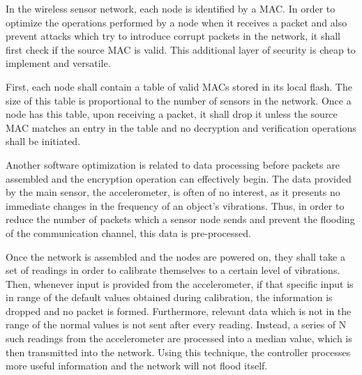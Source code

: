 In the wireless sensor network, each node is identified by a MAC. In order to optimize the 
operations performed by a node when it receives a packet and also prevent attacks which 
try to introduce corrupt packets in the network, it shall first check if the source MAC 
is valid. This additional layer of security is cheap to implement and versatile.

First, each node shall contain a table of valid MACs stored in its local flash. The size of this 
table is proportional to the number of sensors in the network. Once a node has this table, upon 
receiving a packet, it shall drop it unless the source MAC matches an entry in the table 
and no decryption and verification operations shall be initiated.

Another software optimization is related to data processing before packets are assembled and 
the encryption operation can effectively begin. The data provided by the main sensor, the 
accelerometer, is often of no interest, as it presents no immediate changes in the frequency of 
an object's vibrations. Thus, in order to reduce the number of packets which a sensor node sends 
and prevent the flooding of the communication channel, this data is pre-processed.

Once the network is assembled and the nodes are powered on, they shall take a set of 
readings in order to calibrate themselves to a certain level of vibrations. Then, 
whenever input is provided from the accelerometer, if that specific input is in 
range of the default values obtained during calibration, the information is dropped 
and no packet is formed. Furthermore, relevant data which is not in the range of the 
normal values is not sent after every reading. Instead, a series of N such readings 
from the accelerometer are processed into a median value, which is then transmitted 
into the network. Using this technique, the controller processes more useful information 
and the network will not flood itself.

